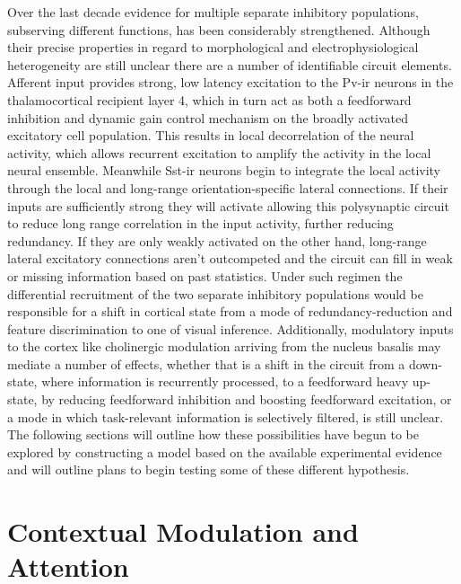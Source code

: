 Over the last decade evidence for multiple separate inhibitory
populations, subserving different functions, has been considerably
strengthened. Although their precise properties in regard to
morphological and electrophysiological heterogeneity are still unclear
there are a number of identifiable circuit elements. Afferent input
provides strong, low latency excitation to the Pv-ir neurons in the
thalamocortical recipient layer 4, which in turn act as both a
feedforward inhibition and dynamic gain control mechanism on the
broadly activated excitatory cell population. This results in local
decorrelation of the neural activity, which allows recurrent
excitation to amplify the activity in the local neural
ensemble. Meanwhile Sst-ir neurons begin to integrate the local
activity through the local and long-range orientation-specific lateral
connections. If their inputs are sufficiently strong they will
activate allowing this polysynaptic circuit to reduce long range
correlation in the input activity, further reducing redundancy. If
they are only weakly activated on the other hand, long-range lateral
excitatory connections aren't outcompeted and the circuit can fill in
weak or missing information based on past statistics. Under such
regimen the differential recruitment of the two separate inhibitory
populations would be responsible for a shift in cortical state from a
mode of redundancy-reduction and feature discrimination to one of
visual inference. Additionally, modulatory inputs to the cortex like
cholinergic modulation arriving from the nucleus basalis may mediate a
number of effects, whether that is a shift in the circuit from a
down-state, where information is recurrently processed, to a
feedforward heavy up-state, by reducing feedforward inhibition and
boosting feedforward excitation, or a mode in which task-relevant
information is selectively filtered, is still unclear. The following
sections will outline how these possibilities have begun to be
explored by constructing a model based on the available experimental
evidence and will outline plans to begin testing some of these
different hypothesis.

\section{Contextual Modulation and Attention} \label{contextualmodulation}

